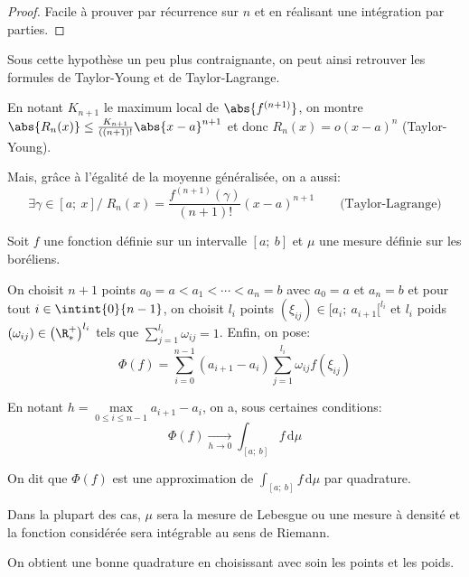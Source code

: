 \begin{proof}
Facile à prouver par récurrence sur $n$ et en réalisant une intégration par parties.
\end{proof}

\begin{listremarques}
\item
Sous cette hypothèse un peu plus contraignante, on peut ainsi retrouver les formules de Taylor-Young et de Taylor-Lagrange. 

En notant $K_{n+1}$ le maximum local de $\abs{f^{(n+1)}}$, on montre $\abs{R_n(x)} \leq \frac{K_{n+1}}{((n+1)!} \abs{x-a}^{n+1}$ et donc $R_n(x) = o(x-a)^n$ (Taylor-Young).

Mais, grâce à l'égalité de la moyenne généralisée, on a aussi:
\[
\exists \gamma \in [a;~x]/ \; R_n(x) = \dfrac{f^{(n+1)}(\gamma)}{(n+1)!} (x-a)^{n+1} \qquad \text{(Taylor-Lagrange)}
\]
\end{listremarques}

\begin{de}
Soit $f$ une fonction définie sur un intervalle $[a;~b]$ et $\mu$ une mesure définie sur les boréliens.

\medskip
On choisit $n+1$ points $a_0 = a < a_1 < \cdots < a_n = b$ avec $a_0 = a$ et $a_n = b$ et pour tout $i \in \intint{0}{n-1}$, on choisit $l_i$ points $\left (\xi_{ij}\right ) \in [a_i;~a_{i+1}[^{l_i}$ et $l_i$ poids $\left (\omega_{ij}\right ) \in \left (\R^+_* \right )^{l_i}$ tels que $\displaystyle{\sum_{j=1}^{l_i}} \omega_{ij} = 1$. Enfin, on pose:
\[
\Phi(f) = \displaystyle{\sum_{i=0}^{n-1}} (a_{i+1}-a_i) \displaystyle{\sum_{j=1}^{l_i}} \omega_{ij} f\left ( \xi_{ij}\right )
\]

En notant $h = \max \limits_{0\leq i \leq n-1} a_{i+1}-a_i$, on a, sous certaines conditions:
\[
\Phi(f) \underset{h \to 0}{\longrightarrow} \displaystyle{\int_{[a;~b]}} f \, \mathrm d \mu 
\]

On dit que $\Phi(f)$ est une approximation de $\displaystyle{\int_{[a;~b]}} f \, \mathrm d \mu$ par quadrature.
\end{de}


\begin{listremarques}
\item
Dans la plupart des cas, $\mu$ sera la mesure de Lebesgue ou une mesure à densité et la fonction considérée sera intégrable au sens de Riemann.
\item 
On obtient une bonne quadrature en choisissant avec soin les points et les poids.
\end{listremarques}

